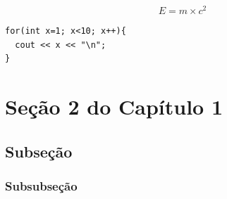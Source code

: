 \begin{equation}
E = m \times c^2
\label{eq1}
\end{equation}

\begin{lstlisting}[caption={Loop simples},label=cod1,numbers=none]
for(int x=1; x<10; x++){
  cout << x << "\n";
}
\end{lstlisting}

\section{Se\c{c}\~{a}o 2 do Capítulo 1}  
\subsection{Subseção}
\subsubsection{Subsubseção}

